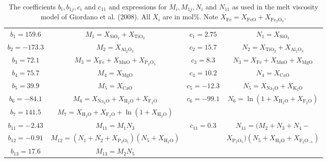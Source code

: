 \documentclass[]{book}
\theoremstyle{definition}
\begin{document}
\begin{enumerate}
  \begin{table}
    \caption{The coefficients $b_{i}, b_{1j}, c_{i}$ and $c_{11}$ and expressions for $M_{i}, M_{1j}, N_{i}$ and $N_{11}$ as used in the melt viscosity model of Giordano et al. (2008). All $X_{i}$ are in mol\%. Note $X_{\text{Fe}} = X_{\text{FeO}} + X_{\text{Fe}_{2}\text{O}_{3}}$.\label{tab:viscos}}
    \begin{tabular}{|c|c||c|c|}
      \hline
      $b_{1} = 159.6$ & $M_{1} = X_{\text{SiO}_{2}} + X_{\text{TiO}_{2}}$ & $c_{1} = 2.75$ & $N_{1} = X_{\text{SiO}_{2}}$ \\
      $b_{2} = -173.3$ & $M_{2} = X_{\text{Al}_{2}\text{O}_{3}}$ & $c_{2} = 15.7$ & $N_{2} = X_{\text{TiO}_{2}} + X_{\text{Al}_{2}\text{O}_{3}}$ \\
      $b_{3} = 72.1$ & $M_{3} = X_{\text{Fe}} + X_{\text{MnO}} + X_{\text{P}_{2}\text{O}_{5}}$ & $c_{3} = 8.3$ & $N_{3} = X_{\text{Fe}} + X_{\text{MnO}} + X_{\text{MgO}}$ \\
      $b_{4} = 75.7$ & $M_{4} = X_{\text{MgO}}$ & $c_{4} = 10.2$ & $N_{4} = X_{\text{CaO}}$ \\
      $b_{5} = 39.9$ & $M_{5} = X_{\text{CaO}}$ & $c_{5} = -12.3$ & $N_{5} = X_{\text{Na}_{2}\text{O}} + X_{\text{K}_{2}\text{O}}$ \\
      $b_{6} = -84.1$ & $M_{6} = X_{\text{Na}_{2}\text{O}} + X_{\text{H}_{2}\text{O}} + X_{\text{F}_{2}\text{O}}$ & $c_{6} = -99.1$ & $N_{6} = \ln(1 + X_{\text{H}_{2}\text{O}} + X_{\text{F}_{2}\text{O}})$ \\
      $b_{7} = 141.5$ & $M_{7} = X_{\text{H}_{2}\text{O}} + X_{\text{F}_{2}\text{O}} + \ln(1 + X_{\text{H}_{2}\text{O}})$& &  \\
      \hline
      $b_{11} = -2.43$ & $M_{11} = M_{1} N_{3}$ & $c_{11} = 0.3$& $N_{11} = (M_{2} + N_{3} + N_{4} - $\\
      $b_{12} = -0.91$ & $M_{12} = (N_{1} + N_{2} + X_{\text{P}_{2}\text{O}_{5}}) (N_{5} + X_{\text{H}_{2}\text{O}})$ & & $X_{\text{P}_{2}\text{O}_{5}}) (N_{5} + X_{\text{H}_{2}\text{O}} + X_{\text{F}_{2}\text{O}_{-1}})$ \\
      $b_{13} = 17.6$ & $M_{13} = M_{2} N_{5}$ & &  \\    
      \hline
    \end{tabular}
  \end{table}


\end{enumerate}
\end{document}
